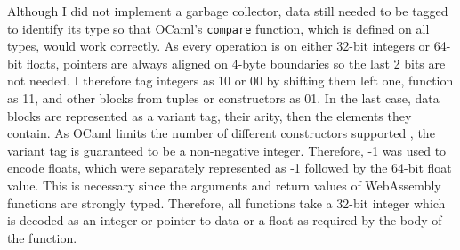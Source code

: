 Although I did not implement a garbage collector, data still needed to be tagged to identify its type so that OCaml's \verb|compare| function, which is defined on all types, would work correctly. As every operation is on either 32-bit integers or 64-bit floats, pointers are always aligned on 4-byte boundaries so the last 2 bits are not needed. I therefore tag integers as 10 or 00 by shifting them left one, function as 11, and other blocks from tuples or constructors as 01. In the last case, data blocks are represented as a variant tag, their arity, then the elements they contain. As OCaml limits the number of different constructors supported%
, the variant tag is guaranteed to be a non-negative integer. Therefore, -1 was used to encode floats, which were separately represented as -1 followed by the 64-bit float value. This is necessary since the arguments and return values of WebAssembly functions are strongly typed. Therefore, all functions take a 32-bit integer which is decoded as an integer or pointer to data or a float as required by the body of the function.





